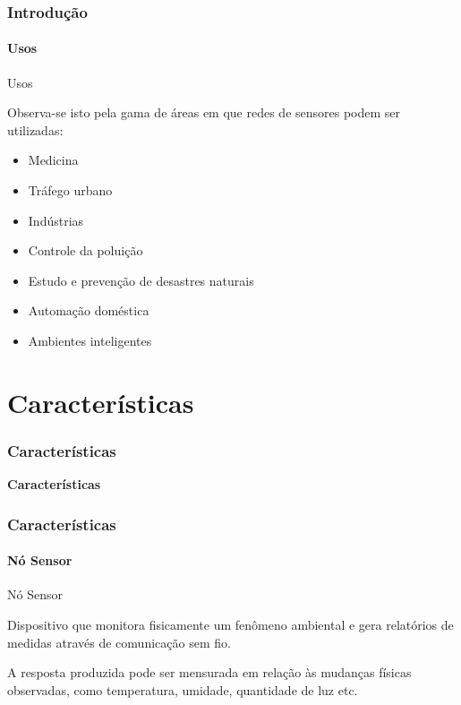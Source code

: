\documentclass[notes]{beamer}
\begin{document}
\begin{frame}
\label{slide_10}
\frametitle{Introdução}
\framesubtitle{Usos}

\begin{block}{Usos}

Observa-se isto pela gama de áreas em que redes de sensores podem ser utilizadas: \pause

\begin{itemize}

\item Medicina \pause
\item Tráfego urbano \pause
\item Indústrias \pause
\item Controle da poluição \pause
\item Estudo e prevenção de desastres naturais \pause
\item Automação doméstica \pause
\item Ambientes inteligentes 

\end{itemize}

\end{block}

\end{frame}

\section{Características}
\begin{frame}
\label{slide_11}
\frametitle{Características}

\begin{block}

 \center \textbf{Características}
 
\end{block}

\end{frame}

\begin{frame}
\label{slide_12}
\frametitle{Características}
\framesubtitle{Nó Sensor}

\begin{block}{Nó Sensor}

Dispositivo que monitora fisicamente um fenômeno ambiental e gera
relatórios de medidas através de comunicação sem
fio\nocite{Clicia}.
\end{block}

\begin{block}

A resposta produzida pode ser mensurada em relação às mudanças físicas observadas, como temperatura, umidade, quantidade de luz etc.
\end{block}

\end{frame}
\end{document}
